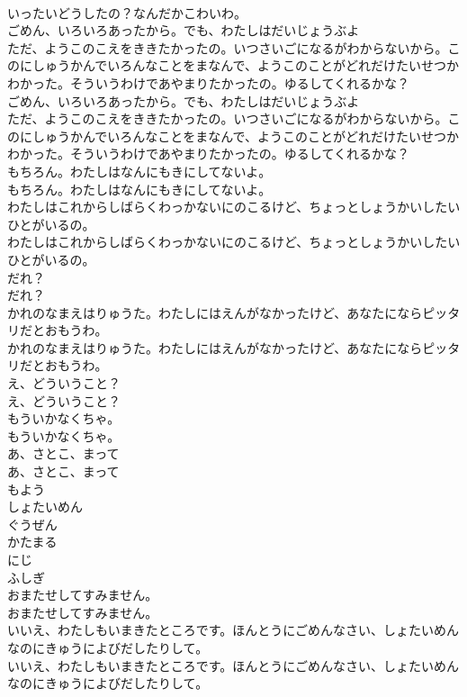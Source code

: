 \documentclass[8pt]{extreport}
\begin{document}
\begin{CJK}{UTF8}{min}
\\	いったいどうしたの？なんだかこわいわ。
\\	ごめん、いろいろあったから。でも、わたしはだいじょうぶよ
\\	ただ、ようこのこえをききたかったの。いつさいごになるがわからないから。このにしゅうかんでいろんなことをまなんで、ようこのことがどれだけたいせつかわかった。そういうわけであやまりたかったの。ゆるしてくれるかな？
\\	ごめん、いろいろあったから。でも、わたしはだいじょうぶよ
\\	ただ、ようこのこえをききたかったの。いつさいごになるがわからないから。このにしゅうかんでいろんなことをまなんで、ようこのことがどれだけたいせつかわかった。そういうわけであやまりたかったの。ゆるしてくれるかな？
\\	もちろん。わたしはなんにもきにしてないよ。
\\	もちろん。わたしはなんにもきにしてないよ。
\\	わたしはこれからしばらくわっかないにのこるけど、ちょっとしょうかいしたいひとがいるの。
\\	わたしはこれからしばらくわっかないにのこるけど、ちょっとしょうかいしたいひとがいるの。
\\	だれ？
\\	だれ？
\\	かれのなまえはりゅうた。わたしにはえんがなかったけど、あなたにならピッタリだとおもうわ。
\\	かれのなまえはりゅうた。わたしにはえんがなかったけど、あなたにならピッタリだとおもうわ。
\\	え、どういうこと？
\\	え、どういうこと？
\\	もういかなくちゃ。
\\	もういかなくちゃ。
\\	あ、さとこ、まって
\\	あ、さとこ、まって
\\	もよう
\\	しょたいめん
\\	ぐうぜん
\\	かたまる
\\	にじ
\\	ふしぎ
\\	おまたせしてすみません。
\\	おまたせしてすみません。
\\	いいえ、わたしもいまきたところです。ほんとうにごめんなさい、しょたいめんなのにきゅうによびだしたりして。
\\	いいえ、わたしもいまきたところです。ほんとうにごめんなさい、しょたいめんなのにきゅうによびだしたりして。

\end{CJK}
\end{document}
